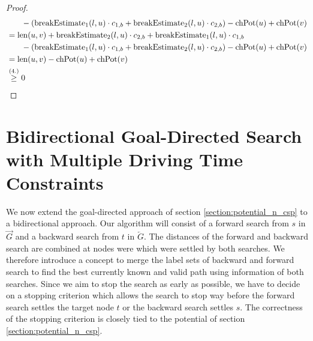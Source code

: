 \begin{proof}
\begin{align}
\begin{split}
			& \phantom{{}=1} - (\breakEstimate_1(l,u) \cdot \restr_{1,b} + \breakEstimate_2(l,u) \cdot \restr_{2,b}) - \chpotential(u) + \chpotential(v)\\
			&= \len(u,v) + \breakEstimate_2(l,u) \cdot \restr_{2,b} + \breakEstimate_1(l,u) \cdot \restr_{1,b} \\
			& \phantom{{}=1} - (\breakEstimate_1(l,u) \cdot \restr_{1,b} + \breakEstimate_2(l,u) \cdot \restr_{2,b}) - \chpotential(u) + \chpotential(v)\\
			&= \len(u,v) - \chpotential(u) + \chpotential(v)\\
			&\stackrel{\text{(4.)}}{\ge} 0
		\end{split}
	\end{align}

\end{proof}




\section{Bidirectional Goal-Directed Search with Multiple Driving Time Constraints}
We now extend the goal-directed approach of section \ref{section:potential_n_csp} to a bidirectional approach. Our algorithm will consist of a forward search from $s$ in $\overrightarrow{G}$ and a backward search from $t$ in $\overleftarrow{G}$. The distances of the forward and backward search are combined at nodes were which were settled by both searches. We therefore introduce a concept to merge the label sets of backward and forward search to find the best currently known and valid path using information of both searches. Since we aim to stop the search as early as possible, we have to decide on a stopping criterion which allows the search to stop way before the forward search settles the target node $t$ or the backward search settles $s$. The correctness of the stopping criterion is closely tied to the potential of section \ref{section:potential_n_csp}.

